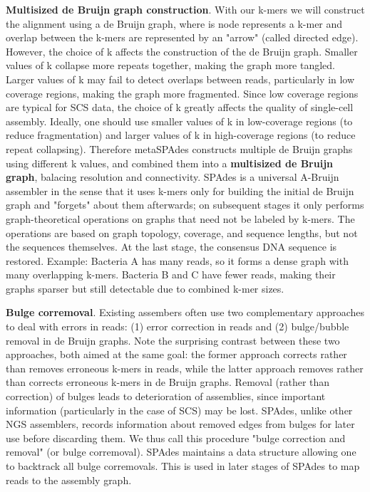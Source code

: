 \textbf{Multisized de Bruijn graph construction}. With our k-mers we will construct the alignment using a de Bruijn 
graph, where is node represents a k-mer and overlap between the k-mers are represented by an "arrow" (called directed edge).
However, the choice of k affects the construction of the de Bruijn graph. Smaller values of 
k collapse more repeats together, making the graph more tangled. Larger values of k may fail to detect overlaps between 
reads, particularly in low coverage regions, making the graph more fragmented. Since low coverage regions are typical for 
SCS data, the choice of k greatly affects the quality of single-cell assembly. Ideally, one should use smaller values of 
k in low-coverage regions (to reduce fragmentation) and larger values of k in high-coverage regions (to reduce repeat 
collapsing). Therefore metaSPAdes constructs multiple de Bruijn graphs using different k values, and combined them into 
a \textbf{multisized de Bruijn graph}, balacing resolution and connectivity. 
SPAdes is a universal A-Bruijn assembler in the sense that it uses k-mers only for building the initial de Bruijn graph 
and "forgets" about them afterwards; on subsequent stages it only performs graph-theoretical operations on graphs that 
need not be labeled by k-mers. The operations are based on graph topology, coverage, and sequence lengths, but not the 
sequences themselves. At the last stage, the consensus DNA sequence is restored. Example: Bacteria A has many reads, so it 
forms a dense graph with many overlapping k-mers. Bacteria B and C have fewer reads, making their graphs sparser but 
still detectable due to combined k-mer sizes.


\textbf{Bulge corremoval}. Existing assembers often use two complementary approaches to deal with errors 
in reads: (1) error correction in reads and (2) \gls{bulge}/bubble removal in de Bruijn graphs. Note the surprising contrast 
between these two approaches, both aimed at the same goal: the former approach corrects rather than removes erroneous 
k-mers in reads, while the latter approach removes rather than corrects erroneous k-mers in de Bruijn graphs. 
Removal (rather than correction) of bulges leads to deterioration of assemblies, since important information (particularly 
in the case of SCS) may be lost. SPAdes, unlike other NGS assemblers, records information about removed edges from 
bulges for later use before discarding them. We thus call this procedure "bulge correction and removal" (or bulge corremoval).
SPAdes maintains a data structure allowing one to backtrack all bulge corremovals. This is used in later stages of SPAdes 
to map reads to the assembly graph.

